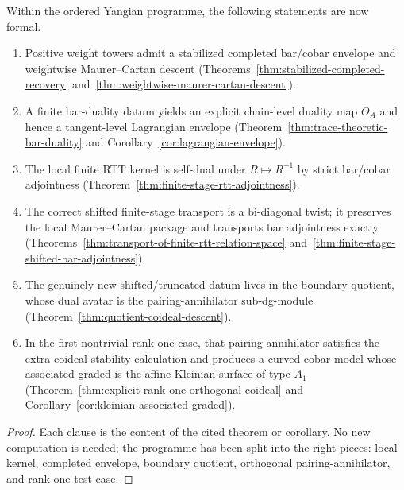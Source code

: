 \begin{theorem}
\label{thm:fortified-frontier-package}
Within the ordered Yangian programme, the following statements are now formal.
\begin{enumerate}[label=\textup{(\arabic*)}]
\item Positive weight towers admit a stabilized completed bar/cobar envelope and
 weightwise Maurer--Cartan descent
 \textup{(}Theorems~\ref{thm:stabilized-completed-recovery}
 and~\ref{thm:weightwise-maurer-cartan-descent}\textup{)}.
\item A finite bar-duality datum yields an explicit chain-level duality map
 $\Theta_A$ and hence a tangent-level Lagrangian envelope
 \textup{(}Theorem~\ref{thm:trace-theoretic-bar-duality} and
 Corollary~\ref{cor:lagrangian-envelope}\textup{)}.
\item The local finite RTT kernel is self-dual under
 $R\mapsto R^{-1}$ by strict bar/cobar adjointness
 \textup{(}Theorem~\ref{thm:finite-stage-rtt-adjointness}\textup{)}.
\item The correct shifted finite-stage transport is a bi-diagonal twist; it
 preserves the local Maurer--Cartan package and transports bar adjointness
 exactly \textup{(}Theorems~\ref{thm:transport-of-finite-rtt-relation-space}
 and~\ref{thm:finite-stage-shifted-bar-adjointness}\textup{)}.
\item The genuinely new shifted/truncated datum lives in the boundary quotient,
 whose dual avatar is the pairing-annihilator sub-dg-module
 \textup{(}Theorem~\ref{thm:quotient-coideal-descent}\textup{)}.
\item In the first nontrivial rank-one case, that pairing-annihilator
 satisfies the extra coideal-stability calculation and produces a curved
 cobar model whose associated graded is the affine Kleinian surface of type $A_1$
 \textup{(}Theorem~\ref{thm:explicit-rank-one-orthogonal-coideal} and
 Corollary~\ref{cor:kleinian-associated-graded}\textup{)}.
\end{enumerate}
\end{theorem}

\begin{proof}
Each clause is the content of the cited theorem or corollary. No new computation is needed; the programme has been split
into the right pieces: local kernel, completed envelope, boundary quotient,
orthogonal pairing-annihilator, and rank-one test case.
\end{proof}

